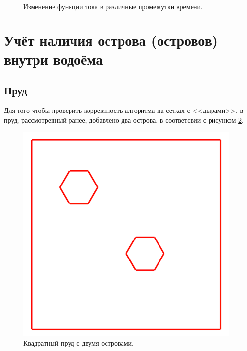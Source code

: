 \documentclass[14pt]{extreport}
\begin{document}
\begin{figure}[H]
  \centering
  \hfill
  \caption{Изменение функции тока в различные промежутки времени.}
  \label{img:ex2:psi:all}
\end{figure}

\section{Учёт наличия острова (островов) внутри водоёма}

\subsection{Пруд}
Для того чтобы проверить корректность алгоритма на сетках с <<дырами>>, в пруд, рассмотренный ранее, добавлено два острова, в соответсвии с рисунком \ref{img:ex3:contour}.

\begin{figure}[H]
\centerline{
\includegraphics[width=0.5\linewidth]{images/ex3/contour}}
\caption{Квадратный пруд с двумя островами.}
\label{img:ex3:contour}
\end{figure}
\end{document}

